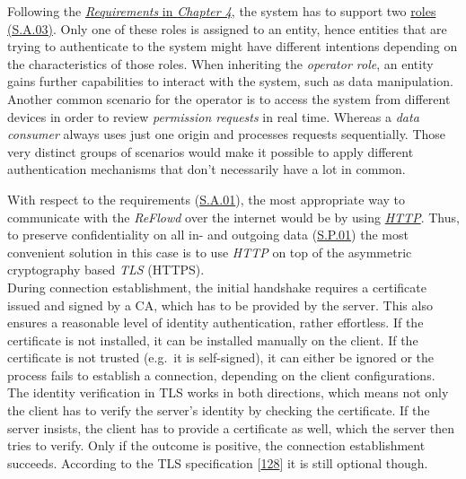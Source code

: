 \documentclass[12pt,english,a4paper,titlepage,cleardoublepage=empty,dottedtoc]{report}
\begin{document}
Following the \protect\hyperlink{requirements}{\emph{Requirements} in
\emph{Chapter 4}}, the system has to support two
\protect\hyperlink{sa03}{roles (S.A.03)}. Only one of these roles is
assigned to an entity, hence entities that are trying to authenticate to
the system might have different intentions depending on the
characteristics of those roles. When inheriting the \emph{operator
role}, an entity gains further capabilities to interact with the system,
such as data manipulation. Another common scenario for the operator is
to access the system from different devices in order to review
\emph{permission requests} in real time. Whereas a \emph{data consumer}
always uses just one origin and processes requests sequentially. Those
very distinct groups of scenarios would make it possible to apply
different authentication mechanisms that don't necessarily have a lot in
common.

With respect to the requirements (\protect\hyperlink{sa01}{S.A.01}), the
most appropriate way to communicate with the \emph{ReFlowd} over the
internet would be by using \emph{\protect\hyperlink{def--http}{HTTP}}.
Thus, to preserve confidentiality on all in- and outgoing data
(\protect\hyperlink{sp01}{S.P.01}) the most convenient solution in this
case is to use \emph{HTTP} on top of the asymmetric cryptography based
\emph{TLS} (HTTPS).\\
During connection establishment, the initial handshake requires a
certificate issued and signed by a CA, which has to be provided by the
server. This also ensures a reasonable level of identity authentication,
rather effortless. If the certificate is not installed, it can be
installed manually on the client. If the certificate is not trusted
(e.g.~it is self-signed), it can either be ignored or the process fails
to establish a connection, depending on the client configurations. The
identity verification in TLS works in both directions, which means not
only the client has to verify the server's identity by checking the
certificate. If the server insists, the client has to provide a
certificate as well, which the server then tries to verify. Only if the
outcome is positive, the connection establishment succeeds. According to
the TLS specification
{[}\protect\hyperlink{ref-web_spec_tls-12_client-auth}{128}{]} it is
still optional though.
\end{document}
